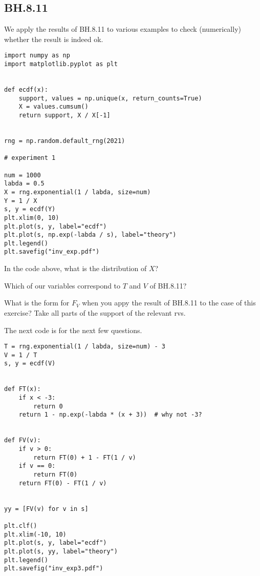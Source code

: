 

\subsection{BH.8.11}
\label{sec:bh-8.1}

We apply the results of BH.8.11 to various examples to check (numerically) whether the result is indeed ok.

\begin{verbatim}
import numpy as np
import matplotlib.pyplot as plt


def ecdf(x):
    support, values = np.unique(x, return_counts=True)
    X = values.cumsum()
    return support, X / X[-1]


rng = np.random.default_rng(2021)

# experiment 1

num = 1000
labda = 0.5
X = rng.exponential(1 / labda, size=num)
Y = 1 / X
s, y = ecdf(Y)
plt.xlim(0, 10)
plt.plot(s, y, label="ecdf")
plt.plot(s, np.exp(-labda / s), label="theory")
plt.legend()
plt.savefig("inv_exp.pdf")
\end{verbatim}

\begin{exercise}
In the code above, what is the distribution of $X$?
\end{exercise}

\begin{exercise}
Which of our variables correspond to $T$ and $V$ of BH.8.11?
\end{exercise}

\begin{exercise}
What is the form for $F_{V}$ when you appy the result of BH.8.11 to the case of this exercise? Take all parts of the support of the relevant rvs.
\end{exercise}

The next code is for the next few questions.

\begin{verbatim}
T = rng.exponential(1 / labda, size=num) - 3
V = 1 / T
s, y = ecdf(V)


def FT(x):
    if x < -3:
        return 0
    return 1 - np.exp(-labda * (x + 3))  # why not -3?


def FV(v):
    if v > 0:
        return FT(0) + 1 - FT(1 / v)
    if v == 0:
        return FT(0)
    return FT(0) - FT(1 / v)


yy = [FV(v) for v in s]

plt.clf()
plt.xlim(-10, 10)
plt.plot(s, y, label="ecdf")
plt.plot(s, yy, label="theory")
plt.legend()
plt.savefig("inv_exp3.pdf")
\end{verbatim}

